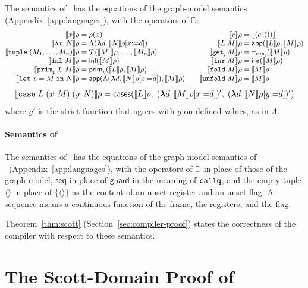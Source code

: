 The semantics of \fpc\ has the equations of the graph-model semantics
(Appendix~\ref{app:languages}), with the operators of $\mathbb{D}$:
\[
\begin{array}{@{}r@{\;}c@{\;}l@{\qquad}r@{\;}c@{\;}l@{}}
  \den{x}\rho & = & \rho(x) &
  \den{c}\rho & = & \up{(c, ())}\\
  \den{\lambda x.\, N}\rho & = & \Lambda(\mlam{d} \den{N}\rho[x{:=}d]) &
  \den{L\;M}\rho & = & \mathsf{app}(\den{L}\rho, \den{M}\rho)\\
  \den{\kw{tuple}\;(M_1, \ldots, M_n)}\rho & = & \mathcal{T}(\den{M_1}\rho, \ldots, \den{M_n}\rho) &
  \den{\kw{get}_i\,M}\rho & = & \pi_{\mathit{tup}_i}(\den{M}\rho)\\
  \den{\kw{inl}\;M}\rho & = & \mathsf{inl}(\den{M}\rho) &
  \den{\kw{inr}\;M}\rho & = & \mathsf{inr}(\den{M}\rho)\\
  \den{\kw{prim}_p\;L\;M}\rho & = & \mathsf{prim}_p(\den{L}\rho, \den{M}\rho) &
  \den{\kw{fold}\;M}\rho & = & \den{M}\rho\\
  \den{\kw{let}\;x = M\;\kw{in}\;N}\rho & = & \mathsf{app}(\Lambda(\mlam{d} \den{N}\rho[x{:=}d]), \den{M}\rho) &
  \den{\kw{unfold}\;M}\rho & = & \den{M}\rho
\end{array}
\]
\[
  \llbracket \mathtt{case}\;L\;(x.\,M)\;(y.\,N) \rrbracket\rho =
    \mathsf{cases}(\llbracket L \rrbracket\rho,\; (\boldsymbol{\lambda} d.\, \llbracket M \rrbracket\rho[x{:=}d])',\; (\boldsymbol{\lambda} d.\, \llbracket N \rrbracket\rho[y{:=}d])')
\]
where $g'$ is the strict function that agrees with $g$ on defined
values, as in $\Lambda$.

\paragraph{Semantics of \instr}

The semantics of \instr\ has the equations of the graph-model
semantics of \instr\ (Appendix~\ref{app:languages}), with the
operators of $\mathbb{D}$ in place of those of the graph model,
$\mathsf{seq}$ in place of $\mathsf{guard}$ in the meaning of
$\mathtt{callq}$, and the empty tuple $\langle\rangle$ in place of
$\{\langle\rangle\}$ as the content of an unset register and an unset
flag. A sequence means a continuous function of the frame, the
registers, and the flag.

Theorem~\ref{thm:scott} (Section~\ref{sec:compiler-proof}) states the
correctness of the compiler with respect to these semantics.

\section{The Scott-Domain Proof of }
\label{app:scott-delay}

